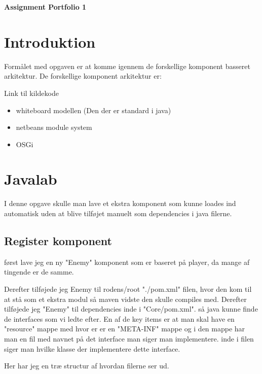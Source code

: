 \begin{center}
{ \LARGE \bfseries Assignment Portfolio 1\\[0.4cm]}
\end{center}

\section{Introduktion}
Formålet med opgaven er at komme igennem de forskellige komponent basseret
arkitektur. De forskellige komponent arkitektur er: 

Link til kildekode \href{}{}

\begin{itemize}
 \item whiteboard modellen (Den der er standard i java)
 \item netbeans module system
 \item OSGi 
\end{itemize}

\section{Javalab}
I denne opgave skulle man lave et ekstra komponent som kunne loades ind
automatisk uden at blive tilføjet manuelt som dependencies i java filerne.

\subsection{Register komponent}
først lave jeg en ny "Enemy" komponent som er baseret på player, da mange af
tingende er de samme. 

Derefter tilføjede jeg Enemy til rodens/root "./pom.xml" filen, hvor den kom
til at stå som et ekstra modul så maven vidste den skulle compiles med.
Derefter tilføjede jeg "Enemy" til dependencies inde i "Core/pom.xml". så java
kunne finde de interfaces som vi ledte efter.  En af de key items er at man
skal have en "resource" mappe med hvor er er en "META-INF" mappe og i den mappe
har man en fil med navnet på det interface man siger man implementere. inde i filen
siger man hvilke klasse der implementere dette interface.

Her har jeg en træ structur af hvordan filerne ser ud.

